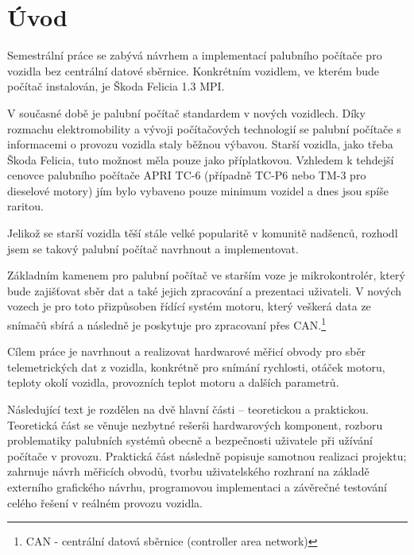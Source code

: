 \chapter*{Úvod}
{}

Semestrální práce se zabývá návrhem a implementací palubního počítače pro vozidla bez centrální datové sběrnice. Konkrétním vozidlem, ve kterém bude počítač instalován, je Škoda Felicia 1.3 MPI.

V současné době je palubní počítač standardem v nových vozidlech. Díky rozmachu elektromobility a vývoji počítačových technologií se palubní počítače s informacemi o provozu vozidla staly běžnou výbavou.
Starší vozidla, jako třeba Škoda Felicia, tuto možnost měla pouze jako příplatkovou. Vzhledem k tehdejší cenovce palubního počítače APRI TC-6 (případně TC-P6 nebo TM-3 pro dieselové motory) jím bylo vybaveno pouze minimum vozidel a dnes jsou spíše raritou.

Jelikož se starší vozidla těší stále velké popularitě v komunitě nadšenců, rozhodl jsem se takový palubní počítač navrhnout a implementovat.

Základním kamenem pro palubní počítač ve starším voze je mikrokontrolér, který bude zajišťovat sběr dat a také jejich zpracování a prezentaci uživateli. 
V nových vozech je pro toto přizpůsoben řídící systém motoru, který veškerá data ze snímačů sbírá a následně je poskytuje pro zpracovaní přes CAN.\footnote{CAN - centrální datová sběrnice (controller area network)}

Cílem práce je navrhnout a realizovat hardwarové měřicí obvody pro sběr telemetrických dat z vozidla, konkrétně pro snímání rychlosti, otáček motoru, teploty okolí vozidla, provozních teplot motoru a dalších parametrů.

Následující text je rozdělen na dvě hlavní části – teoretickou a praktickou. Teoretická část se věnuje nezbytné rešerši hardwarových komponent, rozboru problematiky palubních systémů obecně a bezpečnosti uživatele při užívání počítače v provozu.
Praktická část následně popisuje samotnou realizaci projektu; zahrnuje návrh měřicích obvodů, tvorbu uživatelského rozhraní na základě externího grafického návrhu,
programovou implementaci a závěrečné testování celého řešení v reálném provozu vozidla.





